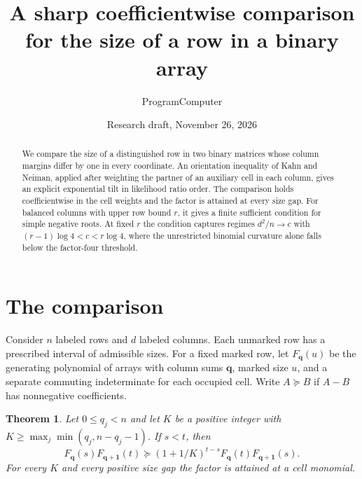 \documentclass[11pt]{article}
\title{A sharp coefficientwise comparison for the size of a row in a binary array}
\author{ProgramComputer}
\date{Research draft, November 26, 2026}
\newtheorem{theorem}{Theorem}
\newcommand{\one}{\mathbf 1}
\newcommand{\q}{\boldsymbol q}
\begin{document}
\maketitle
\begin{abstract}
We compare the size of a distinguished row in two binary matrices whose column margins differ by one in every coordinate. An orientation inequality of Kahn and Neiman, applied after weighting the partner of an auxiliary cell in each column, gives an explicit exponential tilt in likelihood ratio order. The comparison holds coefficientwise in the cell weights and the factor is attained at every size gap. For balanced columns with upper row bound $r$, it gives a finite sufficient condition for simple negative roots. At fixed $r$ the condition captures regimes $d^2/n\to c$ with $(r-1)\log4<c<r\log4$, where the unrestricted binomial curvature alone falls below the factor-four threshold.
\end{abstract}

\section{The comparison}
Consider $n$ labeled rows and $d$ labeled columns. Each unmarked row has a prescribed interval of admissible sizes. For a fixed marked row, let $F_{\q}(u)$ be the generating polynomial of arrays with column sums $\q$, marked size $u$, and a separate commuting indeterminate for each occupied cell. Write $A\succeq B$ if $A-B$ has nonnegative coefficients.

\begin{theorem}\label{th:tilt}
Let $0\le q_j<n$ and let $K$ be a positive integer with $K\ge\max_j\min(q_j,n-q_j-1)$. If $s<t$, then
\[
 F_{\q}(s)F_{\q+\one}(t)
 \succeq (1+1/K)^{t-s}F_{\q}(t)F_{\q+\one}(s).
\]
For every $K$ and every positive size gap the factor is attained at a cell monomial.
\end{theorem}
\end{document}

